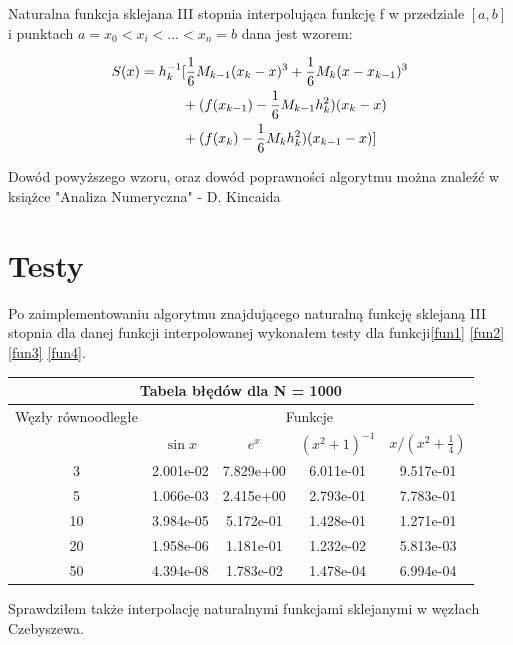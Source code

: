 \documentclass{article}
\begin{document}
\noindent Naturalna funkcja sklejana III stopnia interpolująca funkcję f w przedziale $[a,b]$ i punktach $a = x_0 < x_i <...<x_n = b$ dana jest wzorem:

\begin{align}
	S(x) = h_{k}^{-1}&[\frac{1}{6} M_{k-1}(x_k - x)^3  
					 +\frac{1}{6} M_k (x - x_{k-1})^3 \\
					 \notag
					 &+(f(x_{k-1}) - \frac{1}{6} M_{k-1} h_{k}^2) (x_k -x ) \\
					 \notag
					 &+(f(x_{k}) - \frac{1}{6} M_{k} h_{k}^2) (x_{k-1} -x )]
\end{align}

Dowód powyższego wzoru, oraz dowód poprawności algorytmu można znaleźć w książce "Analiza Numeryczna" - D. Kincaida \cite{kincaid}


\section{Testy}
Po zaimplementowaniu algorytmu znajdującego naturalną funkcję sklejaną III stopnia dla danej funkcji interpolowanej wykonałem testy dla funkcji\eqref{fun1} \eqref{fun2} \eqref{fun3} \eqref{fun4}.

\renewcommand{\arraystretch}{1.5}  
\begin{center}
	\begin{tabular}{||c||c|c|c|c||} \hline
		\multicolumn{5}{||c||}{Tabela błędów dla N = 1000} \\ \hline
		Węzły równoodległe 	& \multicolumn{4}{|c||}{Funkcje} \\ \cline{2-5}
		& $\sin x$ & $e^x$ & $(x^{2}+1)^{-1}$ & $x/(x^{2} + \frac{1}{4})$ \\ \hline					
		3 		& 2.001e-02 &  7.829e+00 &  6.011e-01 & 9.517e-01 \\ \hline
		5 		& 1.066e-03 &  2.415e+00 &  2.793e-01 & 7.783e-01 \\ \hline
		10  	& 3.984e-05 &  5.172e-01 &  1.428e-01 & 1.271e-01 \\ \hline
		20  	& 1.958e-06 &  1.181e-01 &  1.232e-02 & 5.813e-03 \\ \hline
		50  	& 4.394e-08 &  1.783e-02 &  1.478e-04 & 6.994e-04 \\ \hline
	\end{tabular}
\end{center}
\renewcommand{\arraystretch}{1}

Sprawdziłem także interpolację naturalnymi funkcjami sklejanymi w węzłach Czebyszewa.
\end{document}
